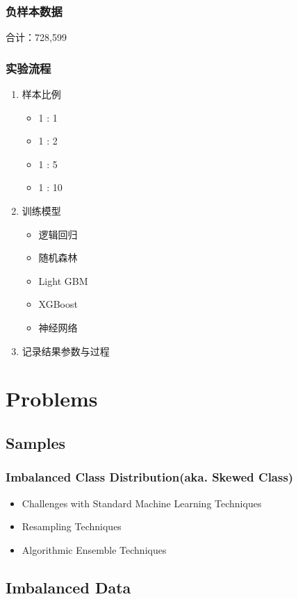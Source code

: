 \documentclass[UTF8,aspectratio=1610,10pt]{ctexbeamer}
\begin{document}
\begin{frame}
\frametitle{负样本数据}
合计：728,599
\end{frame}

\begin{frame}
\frametitle{实验流程}
\begin{enumerate}
  \item 样本比例
	\begin{itemize}
	  \item 1 : 1
	  \item 1 : 2
	  \item 1 : 5
	  \item 1 : 10
	\end{itemize}
  \item 训练模型
	  \begin{itemize}
		  \item 逻辑回归
		  \item 随机森林
		  \item Light GBM
		  \item XGBoost
		  \item 神经网络
		\end{itemize}
  \item 记录结果参数与过程
\end{enumerate}

\end{frame}

\section{Problems}
\subsection{Samples}

\begin{frame}
\frametitle{Imbalanced Class Distribution(aka. Skewed Class)}
\begin{itemize}
  \item Challenges with Standard Machine Learning Techniques
  

  \item Resampling Techniques
  \item Algorithmic Ensemble Techniques
  
\end{itemize}
\end{frame}

\subsection{Imbalanced Data}
\end{document}
